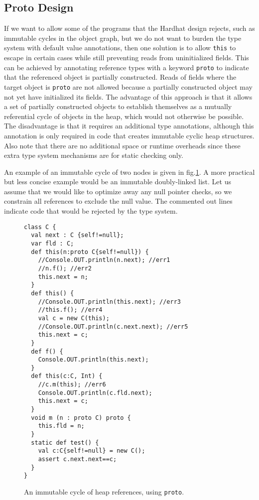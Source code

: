 \subsection{Proto Design}

If we want to allow some of the programs that the Hardhat design rejects, such
as immutable cycles in the object graph, but we do not want to burden the type
system with default value annotations, then one solution is to allow
\texttt{this} to escape in certain cases while still preventing reads from
uninitialized fields.  This can be achieved by annotating reference types with
a keyword \texttt{proto} to indicate that the referenced object is partially
constructed.  Reads of fields where the target object is \texttt{proto}
are not allowed because a partially constructed object may not yet have
initialized its fields.  The advantage of this approach is that it allows a set
of partially constructed objects to establish themselves as a mutually
referential cycle of objects in the heap, which would not otherwise be possible.
The disadvantage is that it requires an additional type annotations, although this
annotation is only required in code that creates immutable cyclic heap
structures.  Also note that there are no additional space or runtime overheads
since these extra type system mechanisms are for static checking only.

An example of an immutable cycle of two nodes is given in
fig.\ref{Figure:Cyclic}.  A more practical but less concise example would be an
immutable doubly-linked list.  Let us assume that we would like to optimize
away any null pointer checks, so we constrain all references to exclude the
null value.  The commented out lines indicate code that would be rejected by
the type system.

\begin{figure}
\begin{lstlisting}
class C {
  val next : C {self!=null};
  var fld : C;
  def this(n:proto C{self!=null}) {
    //Console.OUT.println(n.next); //err1
    //n.f(); //err2
    this.next = n;
  }
  def this() {
    //Console.OUT.println(this.next); //err3
    //this.f(); //err4
    val c = new C(this);
    //Console.OUT.println(c.next.next); //err5
    this.next = c;
  }
  def f() {
    Console.OUT.println(this.next);
  }
  def this(c:C, Int) {
    //c.m(this); //err6
    Console.OUT.println(c.fld.next);
    this.next = c;
  }
  void m (n : proto C) proto {
    this.fld = n;
  }
  static def test() {
    val c:C{self!=null} = new C();
    assert c.next.next==c;
  }
}
\end{lstlisting}
\caption{An immutable cycle of heap references, using \texttt{proto}.}
\label{Figure:Cyclic}
\end{figure}

